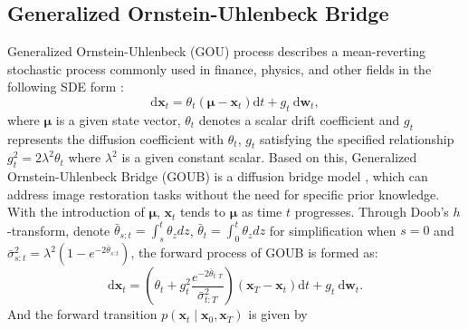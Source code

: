 \subsection{Generalized Ornstein-Uhlenbeck Bridge}
Generalized Ornstein-Uhlenbeck (GOU) process describes a mean-reverting stochastic process commonly used in finance, physics, and other fields in the following SDE form \cite{ahmad1988introduction, Pavliotis2014, WANG2018921}:
\begin{equation}\label{gou_process}
\mathrm{d} \mathbf{x}_t=\theta_t\left(\boldsymbol{\mu}-\mathbf{x}_t\right) \mathrm{d} t+g_t \mathrm{~d} \mathbf{w}_t,
\end{equation}
where $\boldsymbol{\mu}$ is a given state vector, $\theta_t$ denotes a scalar drift coefficient and $g_t$ represents the diffusion coefficient with $\theta_t$, $g_t$ satisfying the specified relationship $g_{t}^{2} = 2 \lambda^2 \theta_t$ where $\lambda^2$ is a given constant scalar. Based on this, Generalized Ornstein-Uhlenbeck Bridge (GOUB) is a diffusion bridge model \cite{yue2024imagerestorationgeneralizedornsteinuhlenbeck}, which can address image restoration tasks without the need for specific prior knowledge. With the introduction of $\boldsymbol{\mu}$, $\mathbf{x}_t$ tends to $\boldsymbol{\mu}$ as time $t$ progresses. Through Doob's $h$-transform, denote $\bar{\theta}_{s:t} = \int_{s}^{t} \theta_z dz$, $\bar{\theta}_{t} = \int_{0}^{t} \theta_z dz$ for simplification when $s=0$ and $\bar{\sigma}^2_{s:t} = \lambda^2(1-e^{-2\bar{\theta}_{s:t}})$, the forward process of GOUB is formed as:
\begin{equation}\label{goub_forward_sde}
\mathrm{d} \mathbf{x}_t=\left(\theta_t+g_t^2 \frac{e^{-2 \bar{\theta}_{t: T}}}{\bar{\sigma}_{t: T}^2}\right)\left(\mathbf{x}_T-\mathbf{x}_t\right) \mathrm{d} t+g_t \mathrm{~d} \mathbf{w}_t.
\end{equation}
And the forward transition $p(\mathbf{x}_t\mid\mathbf{x}_0,\mathbf{x}_T)$ is given by
